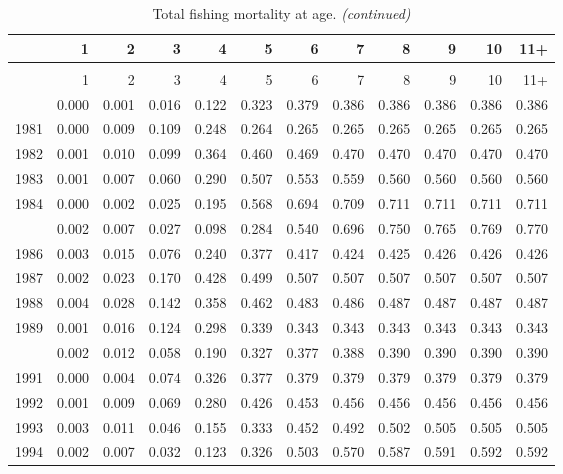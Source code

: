 \documentclass[
]{article}
\begin{document}
\begin{longtable}[t]{lrrrrrrrrrrr}
\caption{\label{tab:FAA-tot-table}Total fishing mortality at age.}\\
\toprule
  & 1 & 2 & 3 & 4 & 5 & 6 & 7 & 8 & 9 & 10 & 11+\\
\midrule
\endfirsthead
\caption[]{Total fishing mortality at age. \textit{(continued)}}\\
\toprule
  & 1 & 2 & 3 & 4 & 5 & 6 & 7 & 8 & 9 & 10 & 11+\\
\midrule
\endhead

\endfoot
\bottomrule
\endlastfoot
1980 & 0.000 & 0.001 & 0.016 & 0.122 & 0.323 & 0.379 & 0.386 & 0.386 & 0.386 & 0.386 & 0.386\\
1981 & 0.000 & 0.009 & 0.109 & 0.248 & 0.264 & 0.265 & 0.265 & 0.265 & 0.265 & 0.265 & 0.265\\
1982 & 0.001 & 0.010 & 0.099 & 0.364 & 0.460 & 0.469 & 0.470 & 0.470 & 0.470 & 0.470 & 0.470\\
1983 & 0.001 & 0.007 & 0.060 & 0.290 & 0.507 & 0.553 & 0.559 & 0.560 & 0.560 & 0.560 & 0.560\\
1984 & 0.000 & 0.002 & 0.025 & 0.195 & 0.568 & 0.694 & 0.709 & 0.711 & 0.711 & 0.711 & 0.711\\
\addlinespace
1985 & 0.002 & 0.007 & 0.027 & 0.098 & 0.284 & 0.540 & 0.696 & 0.750 & 0.765 & 0.769 & 0.770\\
1986 & 0.003 & 0.015 & 0.076 & 0.240 & 0.377 & 0.417 & 0.424 & 0.425 & 0.426 & 0.426 & 0.426\\
1987 & 0.002 & 0.023 & 0.170 & 0.428 & 0.499 & 0.507 & 0.507 & 0.507 & 0.507 & 0.507 & 0.507\\
1988 & 0.004 & 0.028 & 0.142 & 0.358 & 0.462 & 0.483 & 0.486 & 0.487 & 0.487 & 0.487 & 0.487\\
1989 & 0.001 & 0.016 & 0.124 & 0.298 & 0.339 & 0.343 & 0.343 & 0.343 & 0.343 & 0.343 & 0.343\\
\addlinespace
1990 & 0.002 & 0.012 & 0.058 & 0.190 & 0.327 & 0.377 & 0.388 & 0.390 & 0.390 & 0.390 & 0.390\\
1991 & 0.000 & 0.004 & 0.074 & 0.326 & 0.377 & 0.379 & 0.379 & 0.379 & 0.379 & 0.379 & 0.379\\
1992 & 0.001 & 0.009 & 0.069 & 0.280 & 0.426 & 0.453 & 0.456 & 0.456 & 0.456 & 0.456 & 0.456\\
1993 & 0.003 & 0.011 & 0.046 & 0.155 & 0.333 & 0.452 & 0.492 & 0.502 & 0.505 & 0.505 & 0.505\\
1994 & 0.002 & 0.007 & 0.032 & 0.123 & 0.326 & 0.503 & 0.570 & 0.587 & 0.591 & 0.592 & 0.592\\

\end{longtable}
\end{document}
